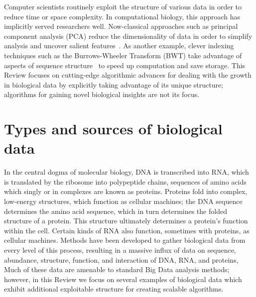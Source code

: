\documentclass{acm_proc_article-sp}
\begin{document}
Computer scientists routinely exploit the structure of various data in
order to reduce time or space complexity.
In computational biology, this approach has implicitly served researchers well.
Now-classical approaches such as principal component analysis (PCA) reduce the 
dimensionality of data in order to simplify analysis and uncover salient 
features~\cite{berger2013computational}.
As another example, clever indexing techniques such as the Burrows-Wheeler 
Transform (BWT) take advantage of aspects of sequence 
structure~\cite{berger2013computational} to speed up computation and save storage.
This Review focuses on cutting-edge algorithmic advances for dealing with the growth in 
biological data by explicitly taking advantage of its unique structure; algorithms for gaining novel biological insights are not its 
focus.


\section{Types and sources of biological data}

In the central dogma of molecular biology, DNA is transcribed into RNA, which
is translated by the ribosome into polypeptide chains, sequences of amino 
acids which singly or in complexes are known as proteins.
Proteins fold into complex, low-energy structures, which function as
cellular machines; the DNA sequence determines the amino acid sequence,
which in turn determines the folded structure of a protein.
This structure ultimately determines a protein's function within the cell.
Certain kinds of RNA also function, sometimes with proteins, as cellular 
machines.
Methods have been developed to gather biological data from every level of this process,
resulting in a massive influx of data on sequence, abundance, structure, function, and interaction of DNA, RNA, and proteins,
Much of these data are amenable to standard Big Data analysis methods; however, in this Review we focus on several examples of biological data which exhibit additional exploitable structure for creating scalable algorithms.
\end{document}
